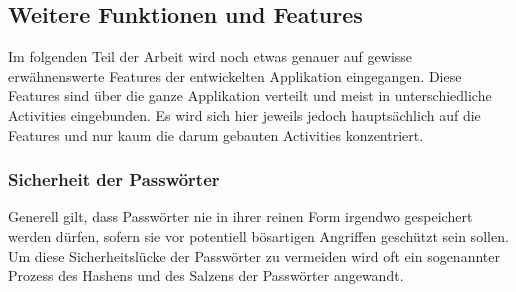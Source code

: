 \documentclass[a4paper,11pt]{report}
\begin{document}
		\subsection{Weitere Funktionen und Features}
		Im folgenden Teil der Arbeit wird noch etwas genauer auf gewisse erwähnenswerte Features der entwickelten Applikation eingegangen. Diese Features sind über die ganze Applikation verteilt und meist in unterschiedliche Activities eingebunden. Es wird sich hier jeweils jedoch hauptsächlich auf die Features und nur kaum die darum gebauten Activities konzentriert.
		
		\subsubsection{Sicherheit der Passwörter}
		Generell gilt, dass Passwörter nie in ihrer reinen Form irgendwo gespeichert werden dürfen, sofern sie vor potentiell bösartigen Angriffen geschützt sein sollen. Um diese Sicherheitslücke der Passwörter zu vermeiden wird oft ein sogenannter Prozess des Hashens und des Salzens der Passwörter angewandt. 
		
\end{document}
